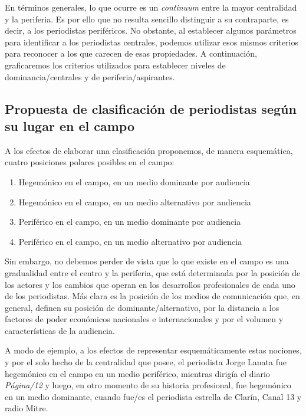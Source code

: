 En términos generales, lo que ocurre es un \emph{continuum} entre la mayor centralidad y la periferia. Es por ello que no resulta sencillo distinguir a su contraparte, es decir, a los periodistas periféricos. No obstante, al establecer algunos parámetros para identificar a los periodistas centrales, podemos utilizar esos mismos criterios para reconocer a los que carecen de esas propiedades. A continuación, graficaremos los criterios utilizados para establecer niveles de dominancia/centrales y de periferia/aspirantes.

\subsection {Propuesta de clasificación de periodistas según su lugar en el campo}

A los efectos de elaborar una clasificación proponemos, de manera esquemática, cuatro posiciones polares posibles en el campo:

\begin{enumerate}
\item
Hegemónico en el campo, en un medio dominante por audiencia
\item
Hegemónico en el campo, en un medio alternativo por audiencia
\item
Periférico en el campo, en un medio dominante por audiencia
\item
Periférico en el campo, en un medio alternativo por audiencia
\end{enumerate}

Sin embargo, no debemos perder de vista que lo que existe en el campo es una gradualidad entre el centro y la periferia, que está determinada por la posición de los actores y los cambios que operan en los desarrollos profesionales de cada uno de los periodistas. Más clara es la posición de los medios de comunicación que, en general, definen su posición de dominante/alternativo, por la distancia a los factores de poder económicos nacionales e internacionales y por el volumen y características de la audiencia.

A modo de ejemplo, a los efectos de representar esquemáticamente estas nociones, y por el solo hecho de la centralidad que posee, el periodista Jorge Lanata fue hegemónico en el campo en un medio periférico, mientras dirigía el diario \emph{Página/12} y luego, en otro momento de su historia profesional, fue hegemónico en un medio dominante, cuando fue/es el periodista estrella de Clarín, Canal 13 y radio Mitre.

